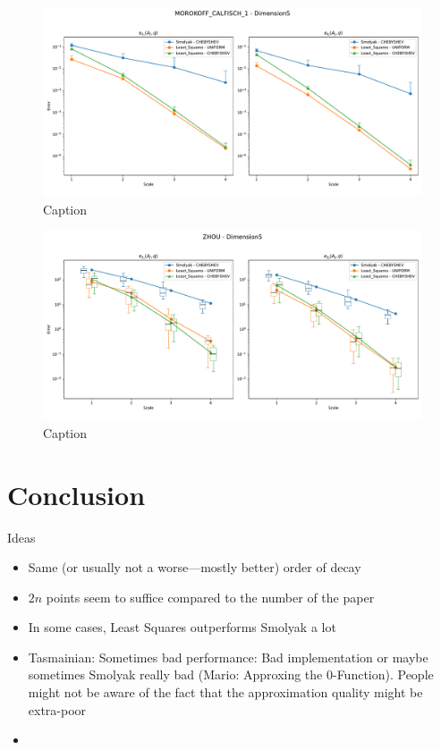 \documentclass[12pt, oneside]{amsart}
\theoremstyle{definition}
\theoremstyle{remark}
\numberwithin{equation}{section}
\begin{document}
\begin{figure}[H]
	\centering
	\includegraphics[width=\linewidth]{figures/morokoff_calfisch1/distro_dim5_scale4.pdf}
	\caption{Caption}
	\label{fig:morokoff_calfisch2_distribution_dim5_scale4}
\end{figure}

\begin{figure}[H] %
	\centering
	\includegraphics[width=\linewidth]{figures/zhou/distro_dim5_scale4.pdf}
	\caption{Caption}
	\label{fig:zhou_distribution_dim5_scale4}
\end{figure}



\section{Conclusion}\label{sec:conclusion}

Ideas
\begin{itemize}
	\item Same (or usually not a worse---mostly better) order of decay
	\item $2n$ points seem to suffice compared to the number of the paper
	\item In some cases, Least Squares outperforms Smolyak a lot
	\item Tasmainian: Sometimes bad performance: Bad implementation or maybe 
	sometimes Smolyak really bad (Mario: Approxing the $0$-Function). People 
	might not be aware of the fact that the approximation quality might be 
	extra-poor
	\item 
\end{itemize}
\end{document}
